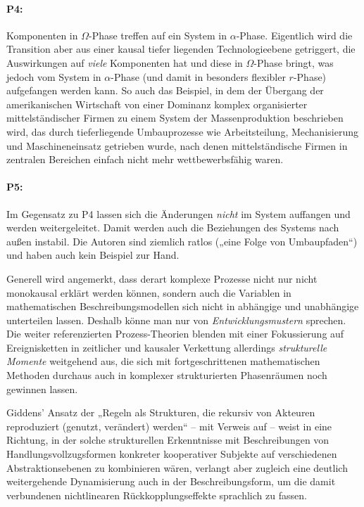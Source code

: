 \documentclass[12pt,a4paper]{article}
\begin{document}
\paragraph{P4:}
Komponenten in $\Omega$-Phase treffen auf ein System in $\alpha$-Phase.
Eigentlich wird die Transition aber aus einer kausal tiefer liegenden
Technologieebene getriggert, die Auswirkungen auf \emph{viele} Komponenten hat
und diese in $\Omega$-Phase bringt, was jedoch vom System in $\alpha$-Phase
(und damit in besonders flexibler $r$-Phase) aufgefangen werden kann. So auch
das Beispiel, in dem der Übergang der amerikanischen Wirtschaft von einer
Dominanz komplex organisierter mittelständischer Firmen zu einem System der
Massenproduktion beschrieben wird, das durch tieferliegende Umbauprozesse wie
Arbeitsteilung, Mechanisierung und Maschineneinsatz getrieben wurde, nach
denen mittelständische Firmen in zentralen Bereichen einfach nicht mehr
wettbewerbsfähig waren.

\paragraph{P5:}
Im Gegensatz zu P4 lassen sich die Änderungen \emph{nicht} im System auffangen
und werden weitergeleitet. Damit werden auch die Beziehungen des Systems nach
außen instabil.  Die Autoren sind ziemlich ratlos („eine Folge von
Umbaupfaden“) und haben auch kein Beispiel zur Hand.

Generell wird angemerkt, dass derart komplexe Prozesse nicht nur nicht
monokausal erklärt werden können, sondern auch die Variablen in mathematischen
Beschreibungsmodellen sich nicht in abhängige und unabhängige unterteilen
lassen.  Deshalb könne man nur von \emph{Entwicklungsmustern} sprechen.  Die
weiter referenzierten Prozess-Theorien blenden mit einer Fokussierung auf
Ereignisketten in zeitlicher und kausaler Verkettung allerdings
\emph{strukturelle Momente} weitgehend aus, die sich mit fortgeschrittenen
mathematischen Methoden durchaus auch in komplexer strukturierten Phasenräumen
noch gewinnen lassen.

Giddens' Ansatz der „Regeln als Strukturen, die rekursiv von Akteuren
reproduziert (genutzt, verändert) werden“ -- \cite[S. 415]{Geels2007} mit
Verweis auf \cite{Giddens1984} -- weist in eine Richtung, in der solche
strukturellen Erkenntnisse mit Beschreibungen von Handlungsvollzugsformen
konkreter kooperativer Subjekte auf verschiedenen Abstraktionsebenen zu
kombinieren wären, verlangt aber zugleich eine deutlich weitergehende
Dynamisierung auch in der Beschreibungsform, um die damit verbundenen
nichtlinearen Rückkopplungseffekte sprachlich zu fassen.
\end{document}

